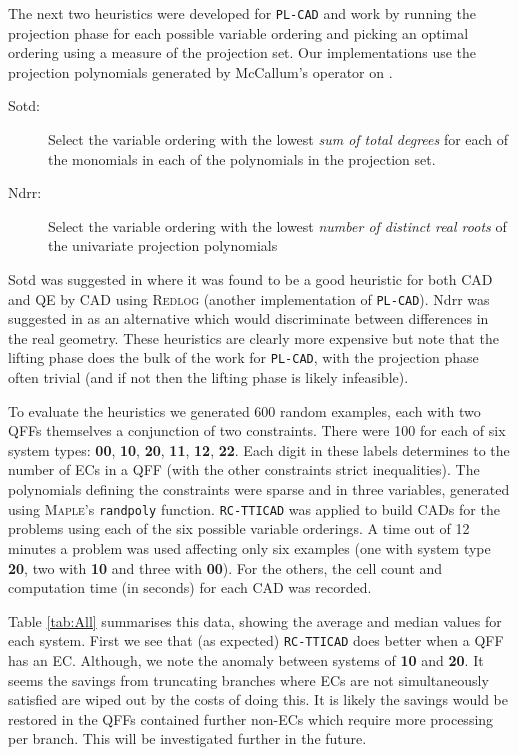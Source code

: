 \documentclass[runningheads,a4paper]{llncs}
\begin{document}
The next two heuristics were developed for \texttt{PL-CAD} and work by running the projection phase for each possible variable ordering and picking an optimal ordering using a measure of the projection set.
Our implementations use the projection polynomials generated by McCallum's operator \cite{McCallum1998} on .
\begin{description}
\item[Sotd:] Select the variable ordering with the lowest \emph{sum of total degrees} for each of the monomials in each of the polynomials in the projection set.
\item[Ndrr:] Select the variable ordering with the lowest \emph{number of distinct real roots} of the univariate projection polynomials
\end{description}  
Sotd was suggested in \cite{DSS04} where it was found to be a good heuristic for both CAD and QE by CAD using \textsc{Redlog} (another implementation of \texttt{PL-CAD}).  Ndrr was suggested in \cite{BDEW13} as an alternative which would discriminate between differences in the real geometry. These heuristics are clearly more expensive but note that the lifting phase does the bulk of the work for \texttt{PL-CAD}, with the projection phase often trivial (and if not then the lifting phase is likely infeasible).  



To evaluate the heuristics we generated 600 random examples, each with two QFFs themselves a conjunction of two constraints.  
There were 100 for each of six system types: \textbf{00}, \textbf{10}, \textbf{20}, \textbf{11}, \textbf{12}, \textbf{22}.  Each digit in these labels determines to the number of ECs in a QFF (with the other constraints strict inequalities).  The polynomials defining the constraints were sparse and in three variables, generated using \textsc{Maple}'s \texttt{randpoly} function.  
\texttt{RC-TTICAD} was applied to build CADs for the problems using each of the six possible variable orderings. 
A time out of 12 minutes a problem was used affecting only six examples (one with system type \textbf{20}, two with \textbf{10} and three with \textbf{00}).  For the others, the cell count and computation time (in seconds) for each CAD was recorded.  

Table \ref{tab:All} summarises this data, showing the average and median values for each system.  First we see that (as expected) \texttt{RC-TTICAD} does better when a QFF has an EC.
Although, we note the anomaly between systems of \textbf{10} and \textbf{20}.  It seems the savings from truncating branches where ECs are not simultaneously satisfied are wiped out by the costs of doing this.  It is likely the savings would be restored in the QFFs contained further non-ECs which require more processing per branch.  This will be investigated further in the future.
\end{document}
